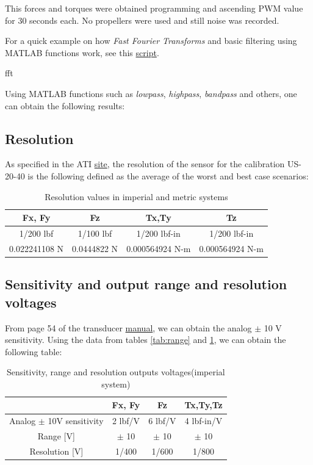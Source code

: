 \documentclass[a4paper]{article}
\begin{document}
This forces and torques were obtained programming and ascending PWM value for 30 seconds each. No propellers were used and still noise was recorded. 

For a quick example on how \textit{Fast Fourier Transforms} and basic filtering using MATLAB functions work, see this \hyperref{URL}{category}{name}{script}.

fft




Using MATLAB functions such as \textit{lowpass}, \textit{highpass}, \textit{bandpass} and others, one can obtain the following results:



\subsection{Resolution}
As specified in the ATI \hyperref{https://www.ati-ia.com/products/ft/ft_models.aspx?id=mini40}{category}{name}{site}, the resolution of the sensor for the calibration US-20-40 is the following defined as the average of the worst and best case
scenarios:

\begin{table}[h!]
	\centering
	\caption{Resolution values in imperial and metric systems\label{tab:resolution}}
	\begin{tabular}{||c | c | c | c||} 
		\hline
		Fx, Fy & Fz & Tx,Ty & Tz \\ [0.5ex] 
		\hline\hline
		1/200 lbf & 1/100 lbf & 1/200 lbf-in & 1/200 lbf-in\\ 
		\hline
		0.022241108 N & 0.0444822 N & 0.000564924 N-m & 0.000564924 N-m \\
		\hline
	\end{tabular}
\end{table}

\subsection{Sensitivity and output range and resolution voltages}

From page 54 of the transducer \href{https://www.ati-ia.com/app_content/documents/9620-05-Transducer%20Section.pdf}{manual}, we can obtain the analog $\pm$ 10 V sensitivity. Using the data from tables \ref{tab:range} and \ref{tab:resolution}, we can obtain the following table:

\begin{table}[h!]
	\centering
	\caption{Sensitivity, range and resolution outputs voltages\label{tab:sensit} (imperial system)}
	\begin{tabular}{||c | c | c | c ||} 
		\hline
		 & Fx, Fy & Fz & Tx,Ty,Tz \\ [0.5ex] 
		\hline\hline
		Analog $\pm$ 10V sensitivity & 2 lbf/V & 6 lbf/V & 4 lbf-in/V\\ 
		\hline
		Range [V] & $\pm$ 10 & $\pm$ 10 & $\pm$ 10 \\
		\hline
		Resolution [V] & 1/400 & 1/600 & 1/800 \\
		\hline
	\end{tabular}
\end{table}
\end{document}
